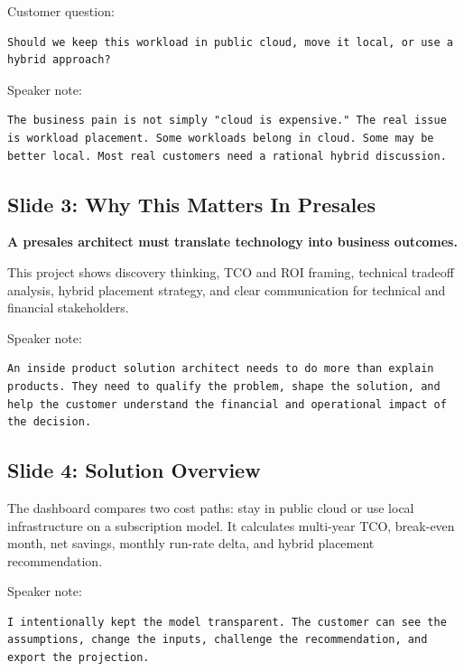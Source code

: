 \documentclass[11pt,a4paper]{article}
\begin{document}
Customer question:

\begin{lstlisting}
Should we keep this workload in public cloud, move it local, or use a hybrid approach?
\end{lstlisting}

Speaker note:

\begin{lstlisting}
The business pain is not simply "cloud is expensive." The real issue is workload placement. Some workloads belong in cloud. Some may be better local. Most real customers need a rational hybrid discussion.
\end{lstlisting}

\subsection{Slide 3: Why This Matters In Presales}

\textbf{A presales architect must translate technology into business outcomes.}

This project shows discovery thinking, TCO and ROI framing, technical tradeoff analysis, hybrid placement strategy, and clear communication for technical and financial stakeholders.

Speaker note:

\begin{lstlisting}
An inside product solution architect needs to do more than explain products. They need to qualify the problem, shape the solution, and help the customer understand the financial and operational impact of the decision.
\end{lstlisting}

\subsection{Slide 4: Solution Overview}

The dashboard compares two cost paths: stay in public cloud or use local infrastructure on a subscription model. It calculates multi-year TCO, break-even month, net savings, monthly run-rate delta, and hybrid placement recommendation.

Speaker note:

\begin{lstlisting}
I intentionally kept the model transparent. The customer can see the assumptions, change the inputs, challenge the recommendation, and export the projection.
\end{lstlisting}
\end{document}
